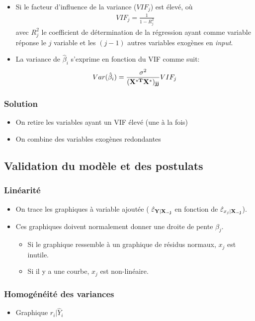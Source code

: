 \documentclass[10pt, french]{article}
\begin{document}
\begin{multicols*}{3}
\begin{itemize}
\item Si le facteur d'influence de la variance ($VIF_j$) est élevé, où
\begin{align*}
VIF_j = \frac{1}{1 - R_j^2}
\end{align*}
avec $R_j^2$ le coefficient de détermination de la régression ayant comme variable réponse le $j$ variable et les $(j-1)$ autres variables exogènes en \textit{input}.
\item La variance de $\hat{\beta}_i$ s'exprime en fonction du VIF comme suit:
\begin{align*}
	Var(\hat{\beta}_i) = \frac{\sigma^2}{(\mathbf{X^{*T} \mathbf{X^*})_{jj}}} VIF_j
\end{align*}
\end{itemize}

\subsubsection*{Solution}
\begin{itemize}
	\item On retire les variables ayant un VIF élevé (une à la fois)
	\item On combine des variables exogènes redondantes	
\end{itemize}

\subsection*{Validation du modèle et des postulats}
\subsubsection*{Linéarité}
\begin{itemize}
\item On trace les graphiques à variable ajoutée ( $\hat{\varepsilon}_{\mathbf{Y} | \mathbf{X_{-j}}}$ en fonction de $\hat{\varepsilon}_{x_j | \mathbf{X_{-j}}}$).
\item Ces graphiques doivent normalement donner une droite de pente $\beta_j$.
\begin{itemize}
	\item Si le graphique ressemble à un graphique de résidus normaux, $x_j$ est inutile.
	\item Si il y a une courbe, $x_j$ est non-linéaire.
\end{itemize}
\end{itemize}

\subsubsection*{Homogénéité des variances}
\begin{itemize}
\item Graphique $r_i | \hat{Y}_i$
\end{itemize}


\end{multicols*}
\end{document}
